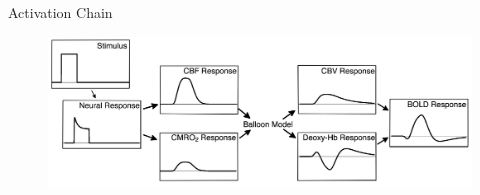 \documentclass{beamer}
\begin{document}
\begin{frame}{Activation Chain}
\begin{figure}
    \includegraphics[width=\textwidth]{graphs}
\caption{
    \tiny
    \cite{Buxton2004}
}
\end{figure}
\end{frame}

\end{document}
